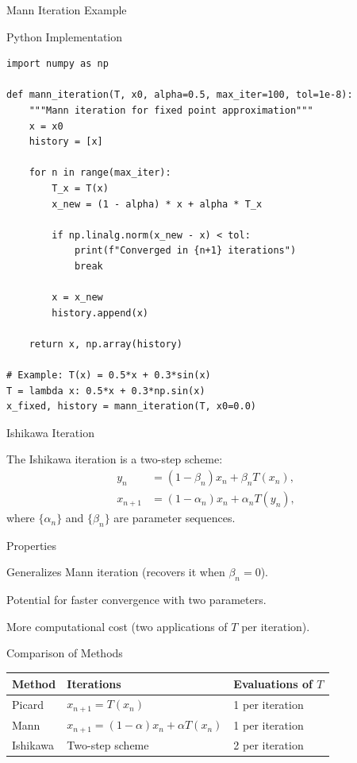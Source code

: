 \documentclass[aspectratio=169,10pt]{beamer}
\begin{document}
\begin{frame}[fragile]{Mann Iteration Example}
  \begin{block}{Python Implementation}
    \begin{lstlisting}
import numpy as np

def mann_iteration(T, x0, alpha=0.5, max_iter=100, tol=1e-8):
    """Mann iteration for fixed point approximation"""
    x = x0
    history = [x]

    for n in range(max_iter):
        T_x = T(x)
        x_new = (1 - alpha) * x + alpha * T_x

        if np.linalg.norm(x_new - x) < tol:
            print(f"Converged in {n+1} iterations")
            break

        x = x_new
        history.append(x)

    return x, np.array(history)

# Example: T(x) = 0.5*x + 0.3*sin(x)
T = lambda x: 0.5*x + 0.3*np.sin(x)
x_fixed, history = mann_iteration(T, x0=0.0)
    \end{lstlisting}
  \end{block}
\end{frame}

\begin{frame}{Ishikawa Iteration}
  \begin{definition}
    The Ishikawa iteration is a two-step scheme:
    \begin{align}
      y_n &= (1 - \beta_n) x_n + \beta_n T(x_n), \\
      x_{n+1} &= (1 - \alpha_n) x_n + \alpha_n T(y_n),
    \end{align}
    where $\{\alpha_n\}$ and $\{\beta_n\}$ are parameter sequences.
  \end{definition}

  \vspace{0.3cm}

  \begin{block}{Properties}
    \item Generalizes Mann iteration (recovers it when $\beta_n = 0$).
    \item Potential for faster convergence with two parameters.
    \item More computational cost (two applications of $T$ per iteration).
  \end{block}

  \vspace{0.3cm}

  \begin{block}{Comparison of Methods}
    \begin{tabular}{lll}
      \hline
      Method & Iterations & Evaluations of $T$ \\
      \hline
      Picard & $x_{n+1} = T(x_n)$ & 1 per iteration \\
      Mann & $x_{n+1} = (1-\alpha)x_n + \alpha T(x_n)$ & 1 per iteration \\
      Ishikawa & Two-step scheme & 2 per iteration \\
      \hline
    \end{tabular}
  \end{block}
\end{frame}
\end{document}
